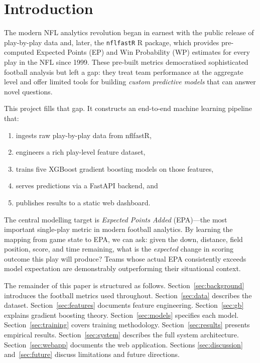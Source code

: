 \documentclass[11pt]{article}
\begin{document}
\section{Introduction}

The modern NFL analytics revolution began in earnest with the public release of
play-by-play data and, later, the \texttt{nflfastR} R package, which provides
pre-computed Expected Points (EP) and Win Probability (WP) estimates for every
play in the NFL since 1999. These pre-built metrics democratised sophisticated
football analysis but left a gap: they treat team performance at the aggregate
level and offer limited tools for building \emph{custom predictive models} that
can answer novel questions.

This project fills that gap. It constructs an end-to-end machine learning pipeline
that:
\begin{enumerate}[noitemsep]
  \item ingests raw play-by-play data from nflfastR,
  \item engineers a rich play-level feature dataset,
  \item trains five XGBoost gradient boosting models on those features,
  \item serves predictions via a FastAPI backend, and
  \item publishes results to a static web dashboard.
\end{enumerate}

The central modelling target is \emph{Expected Points Added} (EPA)---the most
important single-play metric in modern football analytics. By learning the mapping
from game state to EPA, we can ask: given the down, distance, field position, score,
and time remaining, what is the \emph{expected} change in scoring outcome this play
will produce? Teams whose actual EPA consistently exceeds model expectation are
demonstrably outperforming their situational context.

The remainder of this paper is structured as follows. Section~\ref{sec:background}
introduces the football metrics used throughout. Section~\ref{sec:data} describes the
dataset. Section~\ref{sec:features} documents feature engineering. Section~\ref{sec:gb}
explains gradient boosting theory. Section~\ref{sec:models} specifies each model.
Section~\ref{sec:training} covers training methodology. Section~\ref{sec:results}
presents empirical results. Section~\ref{sec:system} describes the full system
architecture. Section~\ref{sec:webapp} documents the web application. Sections
\ref{sec:discussion} and~\ref{sec:future} discuss limitations and future directions.
\end{document}

